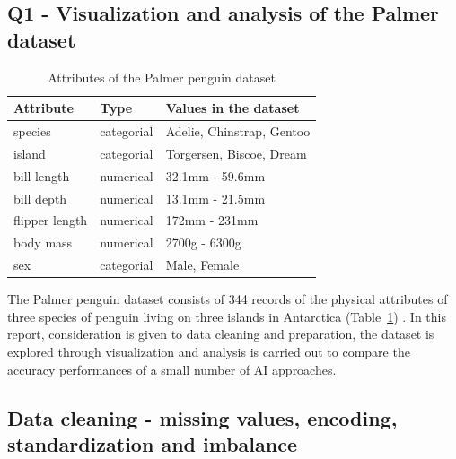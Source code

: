 \documentclass[12pt]{article}
\begin{document}
\begin{center}
\subsection*{Q1 - Visualization and analysis of the Palmer dataset}
\end{center}

\begin{table} %
  \small
  \begin{center}
  \vspace{-1.5\baselineskip} %
  \setlength{\abovecaptionskip}{5pt}
  \setlength{\belowcaptionskip}{5pt}
  \fontsize{10}{10}\selectfont %
  \begin{tabular}{l|l|l}
  Attribute&Type&Values in the dataset\\
  \hline
  species&categorial&Adelie, Chinstrap, Gentoo\\
  island&categorial&Torgersen, Biscoe, Dream\\
  bill length&numerical&32.1mm - 59.6mm\\
  bill depth&numerical&13.1mm - 21.5mm\\
  flipper length&numerical&172mm - 231mm\\
  body mass&numerical&2700g - 6300g\\
  sex&categorial&Male, Female
  \end{tabular}
  \vspace{-1.5\baselineskip} %
  \end{center} 
  \caption{Attributes of the Palmer penguin dataset}
  \vspace{-1\baselineskip} %
  \label{tab:dataset}
\end{table} 

\noindent
The Palmer penguin dataset consists of 344 records of the physical attributes of three species of penguin 
living on three islands in Antarctica (Table~\ref{tab:dataset}) \cite{PM}. 
In this report, consideration is given to data cleaning and preparation, 
the dataset is explored through visualization and analysis is carried out 
to compare the accuracy performances of a small number of AI approaches. 

\vspace{\baselineskip}
\subsection*{Data cleaning - missing values, encoding, standardization and imbalance}
\end{document}
